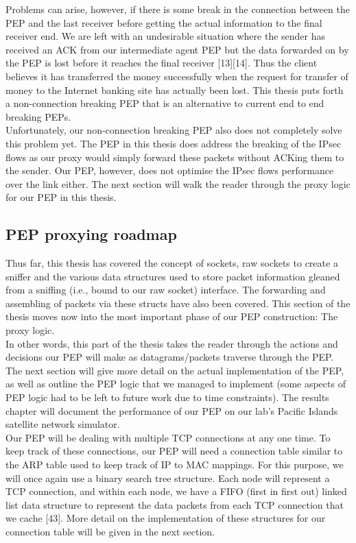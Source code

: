 \documentclass{uathesis}
\begin{document}
Problems can arise, however, if there is some break in the connection between the PEP and the last receiver before getting the actual information to the final receiver end. We are left with an undesirable situation where the sender has received an ACK from our intermediate agent PEP but the data forwarded on by the PEP is lost before it reaches the final receiver [13][14]. Thus the client believes it has transferred the money successfully when the request for transfer of money to the Internet banking site has actually been lost. This thesis puts forth a non-connection breaking PEP that is an alternative to current end to end breaking PEPs. \\

Unfortunately, our non-connection breaking PEP also does not completely solve this problem yet. The PEP in this thesis does address the breaking of the IPsec flows as our proxy would simply forward these packets without ACKing them to the sender. Our PEP, however, does not optimise the IPsec flows performance over the link either. The next section will walk the reader through the proxy logic for our PEP in this thesis.

\subsection{PEP proxying roadmap}
Thus far, this thesis has covered the concept of sockets, raw sockets to create a sniffer and the various data structures used to store packet information gleaned from a sniffing (i.e., bound to our raw socket) interface. The forwarding and assembling of packets via these structs have also been covered. This section of the thesis moves now into the most important phase of our PEP construction: The proxy logic.\\

In other words, this part of the thesis takes the reader through the actions and decisions our PEP will make as datagrams/packets traverse through the PEP. The next section will give more detail on the actual implementation of the PEP, as well as outline the PEP logic that we managed to implement (some aspects of PEP logic had to be left to future work due to time constraints). The results chapter will document the performance of our PEP on our lab's Pacific Islands satellite network simulator.\\

Our PEP will be dealing with multiple TCP connections at any one time. To keep track of these connections, our PEP will need a connection table similar to the ARP table used to keep track of IP to MAC mappings. For this purpose, we will once again use a binary search tree structure. Each node will represent a TCP connection, and within each node, we have a FIFO (first in first out) linked list data structure to represent the data packets from each TCP connection that we cache [43]. More detail on the implementation of these structures for our connection table will be given in the next section. \\
\end{document}
